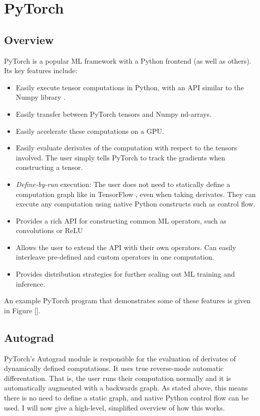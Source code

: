\section{PyTorch}
\subsection{Overview}
PyTorch \cite{Paszke2017} is a popular ML framework with a Python frontend (as well as others).
Its key features include:
\begin{itemize}[topsep=0.2em]
    \item Easily execute tensor computations in Python, with an API similar to the Numpy library \cite{VanDerWalt2011}.
    \item Easily transfer between PyTorch tensors and Numpy nd-arrays.
    \item Easily accelerate these computations on a GPU.
    \item Easily evaluate derivates of the computation with respect to the tensors involved.
    The user simply tells PyTorch to track the gradients when constructing a tensor.
    \item \textit{Define-by-run} execution: The user does not need to statically define a computation graph like in TensorFlow \cite{tensorflow2015-whitepaper}, even when taking derivates.
    They can execute any computation using native Python constructs such as control flow.
    \item Provides a rich API for constructing common ML operators, such as convolutions or ReLU
    \item Allows the user to extend the API with their own operators.
    Can easily interleave pre-defined and custom operators in one computation.
    \item Provides distribution strategies for further scaling out ML training and inference.
\end{itemize}

An example PyTorch program that demonstrates some of these features is given in Figure [].

\subsection{Autograd}
PyTorch's Autograd module is responsible for the evaluation of derivates of dynamically defined computations.
It uses true reverse-mode automatic differentation.
That is, the user runs their computation normally and it is automatically augmented with a backwards graph.
As stated above, this means there is no need to define a static graph, and native Python control flow can be used.
I will now give a high-level, simplified overview of how this works.

